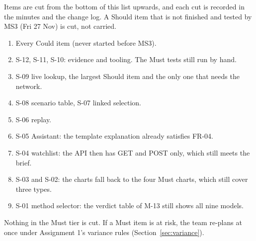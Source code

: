 Items are cut from the bottom of this list upwards, and each cut is recorded in the minutes and the
change log. A Should item that is not finished and tested by MS3 (Fri 27 Nov) is cut, not carried.

\begin{enumerate}
  \item Every Could item (never started before MS3).
  \item S-12, S-11, S-10: evidence and tooling. The Must tests still run by hand.
  \item S-09 live lookup, the largest Should item and the only one that needs the network.
  \item S-08 scenario table, S-07 linked selection.
  \item S-06 replay.
  \item S-05 Assistant: the template explanation already satisfies FR-04.
  \item S-04 watchlist: the API then has GET and POST only, which still meets the brief.
  \item S-03 and S-02: the charts fall back to the four Must charts, which still cover three types.
  \item S-01 method selector: the verdict table of M-13 still shows all nine models.
\end{enumerate}

Nothing in the Must tier is cut. If a Must item is at risk, the team re-plans at once under
Assignment 1's variance rules (Section~\ref{sec:variance}).
